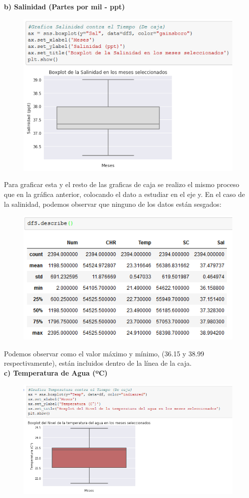\documentclass[12pt]{article}
\begin{document}
\noindent\textbf { b) Salinidad (Partes por mil - ppt)}

\begin{figure}[h]
    \centering
\includegraphics[width=4.5in]{Caja2.png}
\end{figure}

Para graficar esta y el resto de las graficas de caja se realizo el mismo proceso que en la gráfica anterior, colocando el dato a estudiar en el eje y. En el caso de la salinidad, podemos observar que ninguno de los datos están sesgados:

\begin{figure}[h]
    \centering
\includegraphics[width=4.5in]{dfSdescribe.png}
\end{figure}

Podemos observar como el valor máximo y mínimo, (36.15 y 38.99 respectivamente), están incluidos dentro de la línea de la caja.  \\

\noindent\textbf {c) Temperatura de Agua (ºC)}
\begin{figure}[h]
    \centering
\includegraphics[width=5in]{Caja3.png}
\end{figure}
\end{document}
